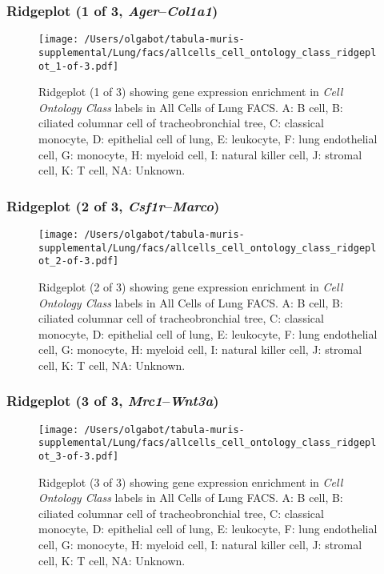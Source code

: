 \clearpage

\subsubsection{Ridgeplot (1 of 3, \emph{Ager}--\emph{Col1a1})}
\begin{figure}[h]
\centering
\texttt{[image: /Users/olgabot/tabula-muris-supplemental/Lung/facs/allcells\_cell\_ontology\_class\_ridgeplot\_1-of-3.pdf]}

\caption{ Ridgeplot (1 of 3)  showing gene expression enrichment in \emph{Cell Ontology Class} labels in All Cells of Lung FACS. A: B cell, B: ciliated columnar cell of tracheobronchial tree, C: classical monocyte, D: epithelial cell of lung, E: leukocyte, F: lung endothelial cell, G: monocyte, H: myeloid cell, I: natural killer cell, J: stromal cell, K: T cell, NA: Unknown.}
\end{figure}


\clearpage

\subsubsection{Ridgeplot (2 of 3, \emph{Csf1r}--\emph{Marco})}
\begin{figure}[h]
\centering
\texttt{[image: /Users/olgabot/tabula-muris-supplemental/Lung/facs/allcells\_cell\_ontology\_class\_ridgeplot\_2-of-3.pdf]}

\caption{ Ridgeplot (2 of 3)  showing gene expression enrichment in \emph{Cell Ontology Class} labels in All Cells of Lung FACS. A: B cell, B: ciliated columnar cell of tracheobronchial tree, C: classical monocyte, D: epithelial cell of lung, E: leukocyte, F: lung endothelial cell, G: monocyte, H: myeloid cell, I: natural killer cell, J: stromal cell, K: T cell, NA: Unknown.}
\end{figure}


\clearpage

\subsubsection{Ridgeplot (3 of 3, \emph{Mrc1}--\emph{Wnt3a})}
\begin{figure}[h]
\centering
\texttt{[image: /Users/olgabot/tabula-muris-supplemental/Lung/facs/allcells\_cell\_ontology\_class\_ridgeplot\_3-of-3.pdf]}

\caption{ Ridgeplot (3 of 3)  showing gene expression enrichment in \emph{Cell Ontology Class} labels in All Cells of Lung FACS. A: B cell, B: ciliated columnar cell of tracheobronchial tree, C: classical monocyte, D: epithelial cell of lung, E: leukocyte, F: lung endothelial cell, G: monocyte, H: myeloid cell, I: natural killer cell, J: stromal cell, K: T cell, NA: Unknown.}
\end{figure}


